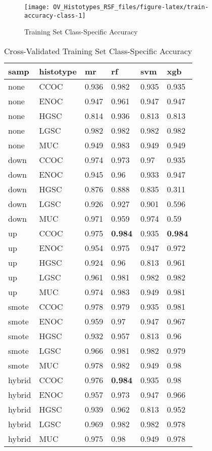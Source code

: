 \documentclass[
]{report}
\begin{document}
\begin{figure}[H]

{\centering \texttt{[image: OV\_Histotypes\_RSF\_files/figure-latex/train-accuracy-class-1]} 

}

\caption{Training Set Class-Specific Accuracy}\label{fig:train-accuracy-class}
\end{figure}

\begin{table}

\caption{\label{tab:train-accuracy-class-table}Cross-Validated Training Set Class-Specific Accuracy}
\centering
\begin{tabular}[t]{l|l|l|l|l|l}
\hline
samp & histotype & mr & rf & svm & xgb\\
\hline
none & CCOC & 0.936 & 0.982 & 0.935 & 0.935\\
\hline
none & ENOC & 0.947 & 0.961 & 0.947 & 0.947\\
\hline
none & HGSC & 0.814 & 0.936 & 0.813 & 0.813\\
\hline
none & LGSC & 0.982 & 0.982 & 0.982 & 0.982\\
\hline
none & MUC & 0.949 & 0.983 & 0.949 & 0.949\\
\hline
down & CCOC & 0.974 & 0.973 & 0.97 & 0.935\\
\hline
down & ENOC & 0.945 & 0.96 & 0.933 & 0.947\\
\hline
down & HGSC & 0.876 & 0.888 & 0.835 & 0.311\\
\hline
down & LGSC & 0.926 & 0.927 & 0.901 & 0.596\\
\hline
down & MUC & 0.971 & 0.959 & 0.974 & 0.59\\
\hline
up & CCOC & 0.975 & \textbf{0.984} & 0.935 & \textbf{0.984}\\
\hline
up & ENOC & 0.954 & 0.975 & 0.947 & 0.972\\
\hline
up & HGSC & 0.924 & 0.96 & 0.813 & 0.961\\
\hline
up & LGSC & 0.961 & 0.981 & 0.982 & 0.982\\
\hline
up & MUC & 0.974 & 0.983 & 0.949 & 0.981\\
\hline
smote & CCOC & 0.978 & 0.979 & 0.935 & 0.981\\
\hline
smote & ENOC & 0.959 & 0.97 & 0.947 & 0.967\\
\hline
smote & HGSC & 0.932 & 0.957 & 0.813 & 0.96\\
\hline
smote & LGSC & 0.966 & 0.981 & 0.982 & 0.979\\
\hline
smote & MUC & 0.978 & 0.982 & 0.949 & 0.98\\
\hline
hybrid & CCOC & 0.976 & \textbf{0.984} & 0.935 & 0.98\\
\hline
hybrid & ENOC & 0.957 & 0.973 & 0.947 & 0.966\\
\hline
hybrid & HGSC & 0.939 & 0.962 & 0.813 & 0.952\\
\hline
hybrid & LGSC & 0.969 & 0.982 & 0.982 & 0.978\\
\hline
hybrid & MUC & 0.975 & 0.98 & 0.949 & 0.978\\
\hline
\end{tabular}
\end{table}
\end{document}
